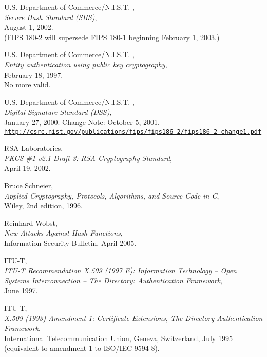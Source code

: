 \newpage
\begin{thebibliography}{99999}

 U.S. Department of Commerce/N.I.S.T. ,
     \\
    {\em Secure Hash Standard (SHS)}, \\
    August 1, 2002.\\
    (FIPS 180-2 will supersede FIPS 180-1 beginning February 1, 2003.)

 U.S. Department of Commerce/N.I.S.T. ,
     \\
    {\em Entity authentication using public key cryptography}, \\
    February 18, 1997.\\
    No more valid.
    
 U.S. Department of Commerce/N.I.S.T. ,
     \\
    {\em Digital Signature Standard (DSS)}, \\
    January 27, 2000. Change Note: October 5, 2001.\\
  \href{http://csrc.nist.gov/publications/fips/fips186-2/fips186-2-change1.pdf}
   {\tt http://csrc.nist.gov/publications/fips/fips186-2/fips186-2-change1.pdf}

 RSA Laboratories,
      \\
    {\em PKCS \#1 v2.1 Draft 3: RSA Cryptography Standard}, \\
    April 19, 2002.

  
    Bruce Schneier, \\
    {\em Applied Cryptography, Protocols, Algorithms, and Source Code in C}, \\
    Wiley, 2nd edition, 1996.

  
    Reinhard Wobst, \\
    {\em New Attacks Against Hash Functions}, \\
    Information Security Bulletin, April 2005.

 ITU-T, 
     \\
    {\em ITU-T Recommendation X.509 (1997 E): Information Technology -- 
    Open Systems Interconnection -- The Directory: Authentication Framework},\\
    June 1997.
    
 ITU-T, 
       \\
    {\em X.509 (1993) Amendment 1: Certificate Extensions, The Directory
    Authentication Framework},\\ 
    International Telecommunication Union, Geneva, Switzerland, July 1995\\
    (equivalent to amendment 1 to ISO/IEC 9594-8).

\end{thebibliography}

